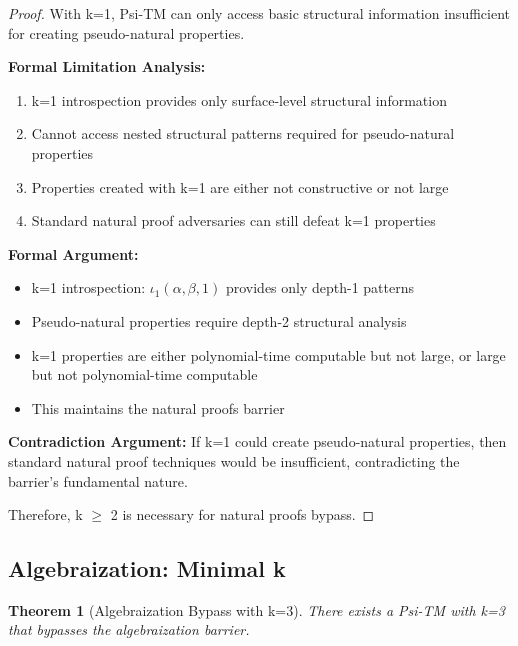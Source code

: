 \documentclass[11pt]{article}
\newtheorem{theorem}{Theorem}
\begin{document}
\begin{proof}
With k=1, Psi-TM can only access basic structural information insufficient for creating pseudo-natural properties.

\textbf{Formal Limitation Analysis:}
\begin{enumerate}
\item k=1 introspection provides only surface-level structural information
\item Cannot access nested structural patterns required for pseudo-natural properties
\item Properties created with k=1 are either not constructive or not large
\item Standard natural proof adversaries can still defeat k=1 properties
\end{enumerate}

\textbf{Formal Argument:}
\begin{itemize}
\item k=1 introspection: $\iota_1(\alpha, \beta, 1)$ provides only depth-1 patterns
\item Pseudo-natural properties require depth-2 structural analysis
\item k=1 properties are either polynomial-time computable but not large, or large but not polynomial-time computable
\item This maintains the natural proofs barrier
\end{itemize}

\textbf{Contradiction Argument:} If k=1 could create pseudo-natural properties, then standard natural proof techniques would be insufficient, contradicting the barrier's fundamental nature.

Therefore, k $\geq$ 2 is necessary for natural proofs bypass.
\end{proof}

\subsection{Algebraization: Minimal k}

\begin{theorem}[Algebraization Bypass with k=3]
\label{thm:algebraization-k3}
There exists a Psi-TM with k=3 that bypasses the algebraization barrier.
\end{theorem}
\end{document}
